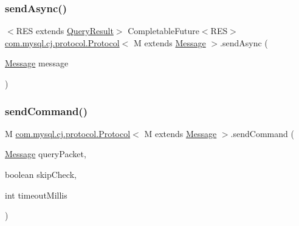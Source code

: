 \mbox{\label{interfacecom_1_1mysql_1_1cj_1_1protocol_1_1_protocol_aa26c38c00e4f25607756ad93288603df}} 
\subsubsection{\texorpdfstring{send\+Async()}{sendAsync()}}
{\footnotesize\ttfamily $<$R\+ES extends \mbox{\hyperlink{interfacecom_1_1mysql_1_1cj_1_1_query_result}{Query\+Result}}$>$ Completable\+Future$<$R\+ES$>$ \mbox{\hyperlink{interfacecom_1_1mysql_1_1cj_1_1protocol_1_1_protocol}{com.\+mysql.\+cj.\+protocol.\+Protocol}}$<$ M extends \mbox{\hyperlink{interfacecom_1_1mysql_1_1cj_1_1protocol_1_1_message}{Message}} $>$.send\+Async (\begin{DoxyParamCaption}\item[{\mbox{\hyperlink{interfacecom_1_1mysql_1_1cj_1_1protocol_1_1_message}{Message}}}]{message }\end{DoxyParamCaption})}

\mbox{\label{interfacecom_1_1mysql_1_1cj_1_1protocol_1_1_protocol_aaef9b7f93e895f19b2f6bc13ec5c2295}} 
\subsubsection{\texorpdfstring{send\+Command()}{sendCommand()}}
{\footnotesize\ttfamily M \mbox{\hyperlink{interfacecom_1_1mysql_1_1cj_1_1protocol_1_1_protocol}{com.\+mysql.\+cj.\+protocol.\+Protocol}}$<$ M extends \mbox{\hyperlink{interfacecom_1_1mysql_1_1cj_1_1protocol_1_1_message}{Message}} $>$.send\+Command (\begin{DoxyParamCaption}\item[{\mbox{\hyperlink{interfacecom_1_1mysql_1_1cj_1_1protocol_1_1_message}{Message}}}]{query\+Packet,  }\item[{boolean}]{skip\+Check,  }\item[{int}]{timeout\+Millis }\end{DoxyParamCaption})}

